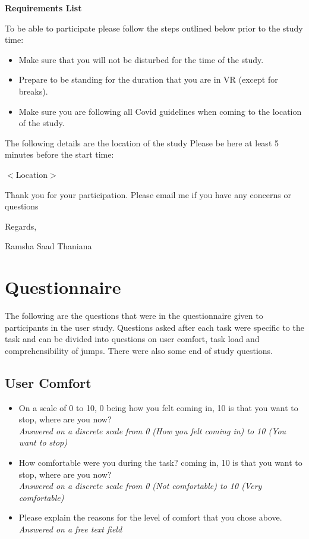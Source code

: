 \textbf{Requirements List}

To be able to participate please follow the steps outlined below prior to the study time:

\begin{itemize}
	\item Make sure that you will not be disturbed for the time of the study.
	\item Prepare to be standing for the duration that you are in VR (except for breaks).
	\item Make sure you are following all Covid guidelines when coming to the location of the study.
\end{itemize}

The following details are the location of the study Please be here at least 5 minutes before the start time:

$<$Location$>$

Thank you for your participation. Please email me if you have any concerns or questions

Regards,

Ramsha Saad Thaniana

\section{Questionnaire}
\label{Appendix:Questionnaire}
The following are the questions that were in the questionnaire given to participants in the user study. Questions asked after each task were specific to the task and can be divided into questions on user comfort, task load and comprehensibility of jumps. There were also some end of study questions.
\subsection{User Comfort}
\begin{itemize}
	\item On a scale of 0 to 10, 0 being how you felt coming in, 10 is that you want to stop, where are you now?\\
	\textit{Answered on a discrete scale from 0 (How you felt coming in) to 10 (You want to stop)}
	\item How comfortable were you during the task? coming in, 10 is that you want to stop, where are you now?\\ 
	\textit{Answered on a discrete scale from 0 (Not comfortable) to 10 (Very comfortable)}
	\item Please explain the reasons for the level of comfort that you chose above.\\
	\textit{Answered on a free text field}
\end{itemize}

